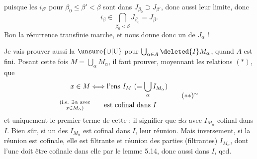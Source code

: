 puisque les $i_{\beta'}$ pour $\beta_0\leq\beta'<\beta$ sont  dans $J_{\beta_0}\supset J_{\beta'}$, donc aussi leur limite,   donc
\[
 i_\beta\in\bigcap_{\beta_0<\beta}J_{\beta_0}=J_\beta .
\]
Bon la récurrence transfinie marche, et nous donne donc un    de $J_\alpha$ !

Je vais prouver aussi la  $\unsure{\cup|\mathrm U}$  pour $\bigcup_{\alpha\in A}\deleted{I}M_\alpha$, quand $A$ est fini. Posant cette fois $M=\bigcup_\alpha M_\alpha$, il faut prouver, moyennant les relations $(\ast)$, que
\[
 \begin{aligned}
 x\in M &\Longleftrightarrow
  \text{l'ens }I_M\ (= \bigcup_\alpha I_{M_\alpha})\\
 \substack{\text{(i.e. }\exists\alpha\text{ avec}\\ x\in M_\alpha\text{)}} &\hspace{2em}\text{est cofinal dans }I
 \end{aligned}
 \tag*{$(\ast\ast)^{\sim}$}
\]
et uniquement  le premier terme de cette  : il  signifier que \deleted{$\unsure{\forall}$} $\exists\alpha$ avec $I_{M_\alpha}$ cofinal dans $I$. Bien sûr, si un des $I_{M_\alpha}$ est cofinal dans $I$,   leur réunion. Mais inversement, si la réunion est cofinale, elle est filtrante et réunion des parties (filtrantes) $I_{M_\alpha}$, dont l'une doit  être cofinale dans elle par le lemme 5.14, donc aussi dans $I$, qed.
